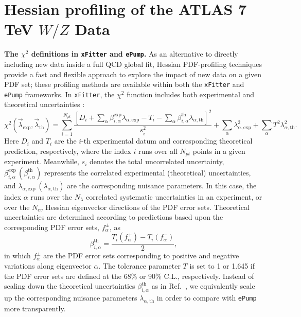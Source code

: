 \section{Hessian profiling of the ATLAS 7 TeV $W/Z$ Data}
\label{sec:Appendix4xFitter}


{\bf The $\chi^{2}$ definitions in \texttt{xFitter} and \texttt{ePump}.}
As an alternative to directly including new data inside a full QCD global fit, Hessian PDF-profiling techniques provide a fast and flexible approach to explore the
impact of new data on a given PDF set; these profiling methods are available within both the \texttt{xFitter} and \texttt{ePump} frameworks.
In \texttt{xFitter}, the $\chi^{2}$ function includes both experimental and theoretical uncertainties \cite{Paukkunen:2014zia,Camarda:2015zba,xFmanual}:	
\begin{equation}\label{eq:chi2xfitter}
\chi^{2}(\vec{\lambda}_{\textrm{exp}},\vec{\lambda}_{\textrm{th}})=
\sum_{i=1}^{N_{pt}}\frac{\left[D_{i}+\sum_{\alpha}\beta^{\textrm{exp}}_{i,\alpha}\lambda_{\alpha,\textrm{exp}}-
T_i-\sum_{\alpha}\beta_{i,\alpha}^{\textrm{th}}\lambda_{\alpha,\textrm{th}}
\right]^{2}}{s_{i}^{2}}+\sum_{\alpha}\lambda_{\alpha,\textrm{exp}}^{2}+\sum_{\alpha}T^2\lambda_{\alpha,\textrm{th}}^{2}.
\end{equation}
Here $D_{i}$ and $T_i$ are the $i$-th experimental datum and corresponding theoretical prediction, respectively, where the index $i$ runs over all $N_\mathit{pt}$ points in a given experiment. 
Meanwhile, $s_{i}$ denotes the total uncorrelated uncertainty, $\beta_{i,\alpha}^{\textrm{exp}}\, (\beta_{i,\alpha}^{\textrm{th}})$ represents the correlated experimental (theoretical) uncertainties,
and $\lambda_{\alpha,\textrm{exp}}\, (\lambda_{\alpha,\textrm{th}})$ are the corresponding nuisance parameters. In this case, the index $\alpha$ runs over the $N_\lambda$ correlated systematic
uncertainties in an experiment, or over the $N_\mathit{ev}$ Hessian eigenvector directions of the PDF error sets. Theoretical uncertainties are determined according to predictions
based upon the corresponding PDF error sets, $f_\alpha^\pm$, as
\begin{equation}
\beta_{i,\alpha}^{\textrm{th}}=\frac{T_i(f_{\alpha}^{+})-T_i(f_{\alpha}^{-})}{2},
\end{equation}
in which $f_{\alpha}^{\pm}$ are the PDF error sets corresponding to positive and negative variations along eigenvector $\alpha$. The tolerance parameter $T$ is set to 1 or 1.645 if the PDF error sets are defined at the 68\% or 90\% C.L., respectively. Instead of scaling down the theoretical uncertainties $\beta^{\textrm{th}}_{i,\alpha}$ as in Ref.~\cite{xFmanual}, we equivalently scale up the corresponding nuisance parameters $\lambda_{\alpha,\textrm{th}}$ in order to compare with \texttt{ePump} \cite{Schmidt:2018hvu,Hou:2019gfw} more transparently.

